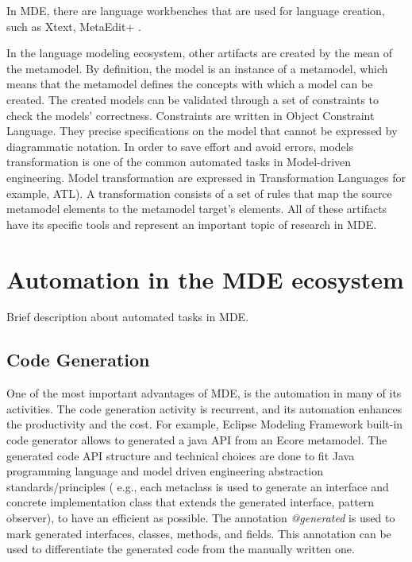 In MDE, there are language workbenches that are used for language creation, such as Xtext, MetaEdit+ \cite{wortmann2020modeling}.



In the language modeling ecosystem, other artifacts are created by the mean of the metamodel. By definition, the model is an instance of a metamodel, which means that the metamodel defines the concepts with which a model can be created. The created models can be validated through a set of constraints to check the models' correctness. Constraints are written in Object Constraint Language. They precise specifications on the model that cannot be  expressed by diagrammatic notation. In order to save effort and avoid errors, models transformation is one of the common automated tasks in Model-driven engineering. Model transformation are expressed in  Transformation Languages for example, ATL). A transformation consists of a set of rules that map the source metamodel elements to the metamodel target’s elements. All of these artifacts have its specific tools and represent an important topic of research in MDE.


\section{Automation in the MDE ecosystem}
\label{mde_automation}
Brief description about automated tasks in MDE.

\subsection{Code Generation}

One of the most important advantages of MDE, is the automation in many of its activities. The code generation activity is recurrent, and its automation enhances the productivity and the cost.
For example, Eclipse Modeling Framework built-in code generator allows to generated a java API from an Ecore metamodel. The generated code API structure and technical choices are done to fit Java programming language and model driven engineering abstraction standards/principles ( e.g., each metaclass is used to generate an interface and concrete implementation class that extends the generated interface, pattern observer), to have an efficient as possible. The annotation 
\textit{@generated} is used to mark generated interfaces, classes, methods, and fields. This annotation can be used to differentiate the generated code from the manually written one.

